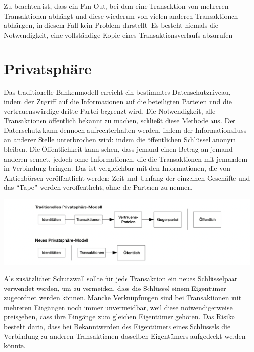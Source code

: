 \documentclass[9pt]{article}
\begin{document}
    Zu beachten ist, dass ein Fan-Out, bei dem eine Transaktion von mehreren Transaktionen abhängt und diese wiederum von vielen anderen Transaktionen abhängen, in diesem Fall kein Problem darstellt. Es besteht niemals die Notwendigkeit, eine vollständige Kopie eines Transaktionsverlaufs abzurufen.	
    
	\newpage
	
	\section{Privatsphäre}
	
    Das traditionelle Bankenmodell erreicht ein bestimmtes Datenschutzniveau, indem der Zugriff auf die Informationen auf die beteiligten Parteien und die vertrauenswürdige dritte Partei begrenzt wird. Die Notwendigkeit, alle Transaktionen öffentlich bekannt zu machen, schließt diese Methode aus. Der Datenschutz kann dennoch aufrechterhalten werden, indem der Informationsfluss an anderer Stelle unterbrochen wird: indem die öffentlichen Schlüssel anonym bleiben. Die Öffentlichkeit kann sehen, dass jemand einen Betrag an jemand anderen sendet, jedoch ohne Informationen, die die Transaktionen mit jemandem in Verbindung bringen. Das ist vergleichbar mit den Informationen, die von Aktienbörsen veröffentlicht werden: Zeit und Umfang der einzelnen Geschäfte und das \enquote{Tape} werden veröffentlicht, ohne die Parteien zu nennen.	

	\begin{center}
		\includegraphics[width=\textwidth]{pics/privacy.png}
	\end{center}
	
    Als zusätzlicher Schutzwall sollte für jede Transaktion ein neues Schlüsselpaar verwendet werden, um zu vermeiden, dass die Schlüssel einem Eigentümer zugeordnet werden können. Manche Verknüpfungen sind bei Transaktionen mit mehreren Eingängen noch immer unvermeidbar, weil diese notwendigerweise preisgeben, dass ihre Eingänge zum gleichen Eigentümer gehören. Das Risiko besteht darin, dass bei Bekanntwerden des Eigentümers eines Schlüssels die Verbindung zu anderen Transaktionen desselben Eigentümers aufgedeckt werden könnte.
	
\end{document}
